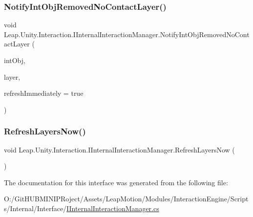 \subsubsection{\texorpdfstring{NotifyIntObjRemovedNoContactLayer()}{NotifyIntObjRemovedNoContactLayer()}}
{\footnotesize\ttfamily void Leap.\+Unity.\+Interaction.\+I\+Internal\+Interaction\+Manager.\+Notify\+Int\+Obj\+Removed\+No\+Contact\+Layer (\begin{DoxyParamCaption}\item[{\mbox{\hyperlink{interface_leap_1_1_unity_1_1_interaction_1_1_i_interaction_behaviour}{I\+Interaction\+Behaviour}}}]{int\+Obj,  }\item[{int}]{layer,  }\item[{bool}]{refresh\+Immediately = {\ttfamily true} }\end{DoxyParamCaption})}

\mbox{\label{interface_leap_1_1_unity_1_1_interaction_1_1_i_internal_interaction_manager_aedd494f5c7653e676961a0a02de62f69}} 
\subsubsection{\texorpdfstring{RefreshLayersNow()}{RefreshLayersNow()}}
{\footnotesize\ttfamily void Leap.\+Unity.\+Interaction.\+I\+Internal\+Interaction\+Manager.\+Refresh\+Layers\+Now (\begin{DoxyParamCaption}{ }\end{DoxyParamCaption})}



The documentation for this interface was generated from the following file\+:\begin{DoxyCompactItemize}
\item 
O\+:/\+Git\+H\+U\+B\+M\+I\+N\+I\+P\+Roject/\+Assets/\+Leap\+Motion/\+Modules/\+Interaction\+Engine/\+Scripts/\+Internal/\+Interface/\mbox{\hyperlink{_i_internal_interaction_manager_8cs}{I\+Internal\+Interaction\+Manager.\+cs}}\end{DoxyCompactItemize}
